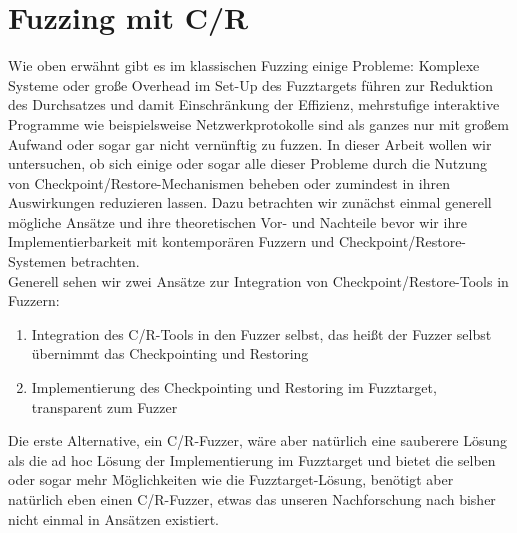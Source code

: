 \documentclass[a4paper]{article}
\begin{document}
\section{Fuzzing mit C/R}
Wie oben erwähnt gibt es im klassischen Fuzzing einige Probleme: Komplexe Systeme oder große Overhead im Set-Up des Fuzztargets führen zur Reduktion des Durchsatzes und damit Einschränkung der Effizienz, mehrstufige interaktive Programme wie beispielsweise Netzwerkprotokolle sind als ganzes nur mit großem Aufwand oder sogar gar nicht vernünftig zu fuzzen. In dieser Arbeit wollen wir untersuchen, ob sich einige oder sogar alle dieser Probleme durch die Nutzung von Checkpoint/Restore-Mechanismen beheben oder zumindest in ihren Auswirkungen reduzieren lassen. Dazu betrachten wir zunächst einmal generell mögliche Ansätze und ihre theoretischen Vor- und Nachteile bevor wir ihre Implementierbarkeit mit kontemporären Fuzzern und Checkpoint/Restore-Systemen betrachten.\\
Generell sehen wir zwei Ansätze zur Integration von Checkpoint/Restore-Tools in Fuzzern:
\begin{enumerate}
    \item Integration des C/R-Tools in den Fuzzer selbst, das heißt der Fuzzer selbst übernimmt das Checkpointing und Restoring
    \item Implementierung des Checkpointing und Restoring im Fuzztarget, transparent zum Fuzzer
\end{enumerate}
Die erste Alternative, ein C/R-Fuzzer, wäre aber natürlich eine sauberere Lösung als die ad hoc Lösung der Implementierung im Fuzztarget und bietet die selben oder sogar mehr Möglichkeiten wie die Fuzztarget-Lösung, benötigt aber natürlich eben einen C/R-Fuzzer, etwas das unseren Nachforschung nach bisher nicht einmal in Ansätzen existiert.\\
\end{document}
